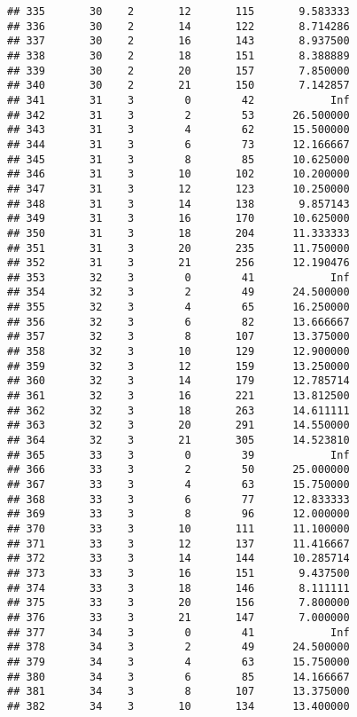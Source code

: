 \documentclass[
]{article}
\begin{document}
\begin{verbatim}
## 335       30    2       12       115       9.583333
## 336       30    2       14       122       8.714286
## 337       30    2       16       143       8.937500
## 338       30    2       18       151       8.388889
## 339       30    2       20       157       7.850000
## 340       30    2       21       150       7.142857
## 341       31    3        0        42            Inf
## 342       31    3        2        53      26.500000
## 343       31    3        4        62      15.500000
## 344       31    3        6        73      12.166667
## 345       31    3        8        85      10.625000
## 346       31    3       10       102      10.200000
## 347       31    3       12       123      10.250000
## 348       31    3       14       138       9.857143
## 349       31    3       16       170      10.625000
## 350       31    3       18       204      11.333333
## 351       31    3       20       235      11.750000
## 352       31    3       21       256      12.190476
## 353       32    3        0        41            Inf
## 354       32    3        2        49      24.500000
## 355       32    3        4        65      16.250000
## 356       32    3        6        82      13.666667
## 357       32    3        8       107      13.375000
## 358       32    3       10       129      12.900000
## 359       32    3       12       159      13.250000
## 360       32    3       14       179      12.785714
## 361       32    3       16       221      13.812500
## 362       32    3       18       263      14.611111
## 363       32    3       20       291      14.550000
## 364       32    3       21       305      14.523810
## 365       33    3        0        39            Inf
## 366       33    3        2        50      25.000000
## 367       33    3        4        63      15.750000
## 368       33    3        6        77      12.833333
## 369       33    3        8        96      12.000000
## 370       33    3       10       111      11.100000
## 371       33    3       12       137      11.416667
## 372       33    3       14       144      10.285714
## 373       33    3       16       151       9.437500
## 374       33    3       18       146       8.111111
## 375       33    3       20       156       7.800000
## 376       33    3       21       147       7.000000
## 377       34    3        0        41            Inf
## 378       34    3        2        49      24.500000
## 379       34    3        4        63      15.750000
## 380       34    3        6        85      14.166667
## 381       34    3        8       107      13.375000
## 382       34    3       10       134      13.400000

\end{verbatim}
\end{document}
